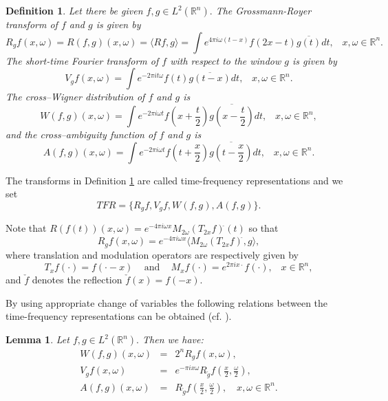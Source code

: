 \documentclass{article}
\theoremstyle{thmstyleone}
\newtheorem{Lemma}[Theorem]{Lemma}%
\theoremstyle{thmstyletwo}%
\theoremstyle{thmstylethree}%
\newtheorem{Definition}[Theorem]{Definition}%
\begin{document}
\begin{Definition} \label{transformacije}
Let there be given $f, g \in L^2 (\mathbb{R}^n).$ The
Grossmann-Royer transform of $f$ and $g$ is given by
\begin{equation} \label{GRT}
R_g f (x,\omega) = R (f,g) (x,\omega)  = \langle R f, g \rangle   = \int e^{4\pi i  \omega(t-x)} f(2x- t) \overline{ g(t)} dt, \;\;\; x,\omega \in \mathbb{R}^n.
\end{equation}
The short-time Fourier transform of
$ f  $ with respect to the window $g$  is given by
\begin{equation} \label{GT}
V_g f (x,\omega) = \int e^{-2\pi i t \omega} f(t)  \overline{ g(t-x)}dt, \;\;\; x,\omega \in \mathbb{R}^n.
\end{equation}
The cross--Wigner distribution of  $f$ and $g$ is
\begin{equation} \label{WD}
W(f,g) (x,\omega)  = \int e^{-2\pi i \omega t} f(x+ \frac{t}{2})
\overline{ g(x- \frac{t}{2})} dt, \;\;\; x,\omega \in \mathbb{R}^n,
\end{equation}
and the cross--ambiguity function of  $f$ and $g$ is
\begin{equation} \label{FWT}
A (f,g) (x, \omega) = \int e^{-2\pi i \omega t}
f(t+ \frac{x}{2}) \overline{ g(t- \frac{x}{2})} dt, \;\;\; x,\omega \in \mathbb{R}^n.
\end{equation}
\end{Definition}


The transforms in Definition \ref{transformacije} are called 
time-frequency representations and we set
$$ 
TFR = \{ R_g f, V_g f, W (f,g), A(f,g)\}.
$$
 
Note that $ R  (f(t) )(x,\omega)  = e^{-4\pi i\omega x}  M_{2\omega}(T_{2x} f)^{\check{}} (t) $ so that
\begin{equation} \label{GRT-trans-mod}
R_g f (x,\omega)  =  e^{-4\pi i\omega x} \langle M_{2\omega} (T_{2x} f)^{\check{}} , g \rangle,
\end{equation}
where translation and modulation operators are respectively given by
$$
T_x f(\cdot) = f(\cdot - x) \;\;\; \mbox{ and } \;\;\;
 M_x f(\cdot) = e^{2\pi i x \cdot} f(\cdot), \;\;\; x \in \mathbb{R}^n,
$$
and $ \check{f} $ denotes the reflection $\check{f} (x) = f (-x)$.

By using appropriate change of variables the following relations between the time-frequency representations can be obtained (cf. \cite{Teo2018}).

\begin{Lemma} \label{GRandRelatives}
Let  $f, g \in L^2 (\mathbb{R}^n).$ Then we have:
\begin{eqnarray*}
W(f,g) (x,\omega)  & = & 2^n R_g f (x,\omega), \\
V_g f (x,\omega) & = &  e^{-\pi i x \omega} R_{\check{g}} f \left(\frac{x}{2},\frac{\omega}{2}\right),
\\
A(f,g) (x,\omega) & = & R_{\check{g}} f \left(\frac{x}{2},\frac{\omega}{2}\right), \quad
x,\omega \in \mathbb{R}^n.
\end{eqnarray*}
\end{Lemma}
\end{document}
